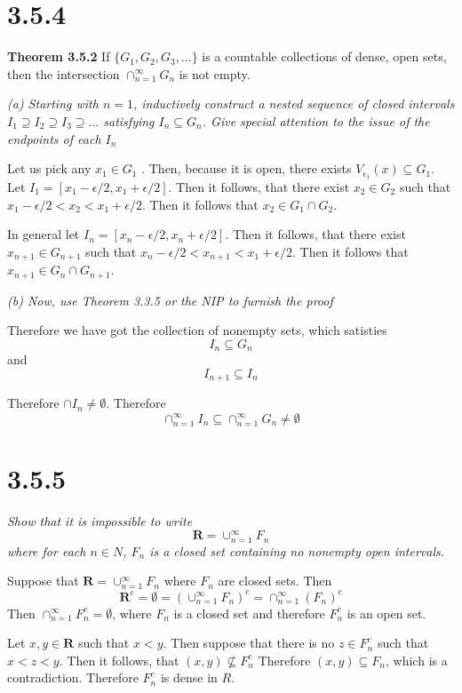 \documentclass[11pt,oneside,titlepage]{book}
\begin{document}
\section*{3.5.4}
\textbf{Theorem 3.5.2}  If $\{G_1, G_2, G_3, ... \}$ is a countable collections of dense,
open sets, then the intersection $\cap_{n = 1}^{\infty} G_n $ is not empty.

\textit{(a) Starting with $n = 1$, inductively construct a nested sequence of
  closed intervals $I_1 \supseteq I_2 \supseteq I_3 \supseteq ... $
  satisfying $I_n \subseteq G_n$. Give special attention to the issue of the
  endpoints of each $I_n$}

Let us pick any $x_1 \in G_1$ . Then, because it is open, there exists
$V_{\epsilon_1}(x) \subseteq G_1$. Let
$I_1 = [x_1 - \epsilon / 2, x_1 + \epsilon / 2]$. Then it follows, that there
exist $x_2 \in G_2$ such that $x_1 - \epsilon / 2 < x_2 < x_1 + \epsilon / 2$.
Then it follows that $x_2 \in  G_1 \cap G_2$.

In general  let
$I_n = [x_n - \epsilon / 2, x_n + \epsilon / 2]$. Then it follows, that there
exist $x_{n + 1} \in G_{n + 1}$ such that
$x_n - \epsilon / 2 < x_{n + 1} < x_1 + \epsilon / 2$.
Then it follows that $x_{n + 1} \in  G_{n} \cap G_{n + 1}$.

\textit{(b) Now, use Theorem 3.3.5 or the NIP to furnish the proof}

Therefore we have got the collection of nonempty sets, which satisties
$$I_n \subseteq G_n$$
and
$$I_{n + 1} \subseteq I_n$$

Therefore $\cap I_n \neq \emptyset$. Therefore
$$\cap_{n = 1}^{\infty} I_n \subseteq
\cap_{n = 1}^{\infty} G_n \neq \emptyset$$

\section*{3.5.5}
\textit{Show that it is impossible to write}
$$\textbf{R} = \cup_{n = 1}^{\infty}F_n$$
\textit{where for each $n \in N$, $F_n$ is a closed set containing
  no nonempty open intervals.}

Suppose that $\textbf{R} = \cup_{n = 1}^{\infty}F_n$ where $F_n$ are closed
sets. Then 
$$\textbf{R}^c = \emptyset = (\cup_{n = 1}^{\infty}F_n)^c =
\cap_{n = 1}^{\infty}(F_n)^c$$
Then $\cap_{n = 1}^{\infty}F_n^c = \emptyset $, where $F_n$ is a closed
set and therefore $F_n^c$ is an open set.

Let  $x,y \in \textbf{R} $ such that $x < y$. Then suppose that
there is no $z \in F_n^c$ such that $x < z < y$. Then it follows, that
$(x, y) \not \subseteq F_n^c$ Therefore $(x, y) \subseteq F_n$, which is a
contradiction. Therefore $F_n^c$ is dense in $R$.
\end{document}

